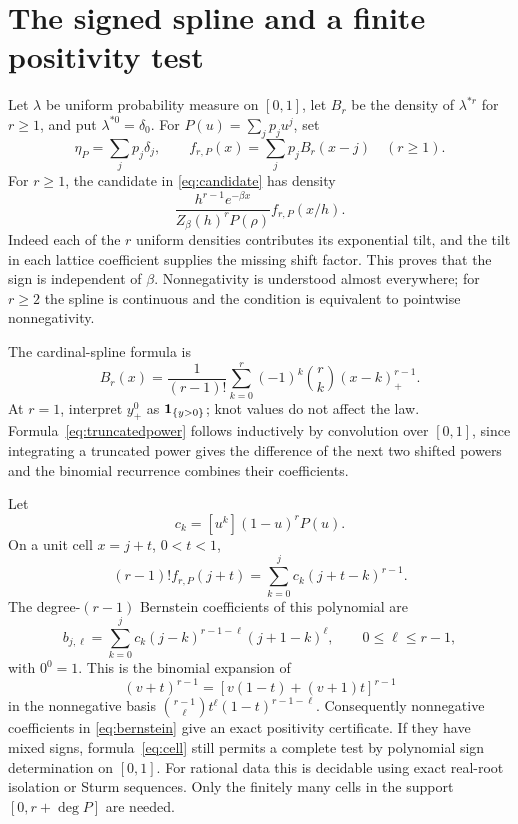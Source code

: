 \documentclass[11pt,a4paper]{article}
\theoremstyle{remark}\newtheorem*{ednote}{Editorial note (ProveIt, 2026-10-01)}
\begin{document}
\section{The signed spline and a finite positivity test}
Let $\lambda$ be uniform probability measure on $[0,1]$, let $B_r$ be the density of $\lambda^{*r}$ for $r\ge1$, and put $\lambda^{*0}=\delta_0$. For $P(u)=\sum_jp_ju^j$, set
\begin{equation}\label{eq:spline}
 \eta_P=\sum_jp_j\delta_j,
 \qquad f_{r,P}(x)=\sum_jp_jB_r(x-j)\quad(r\ge1).
\end{equation}
For $r\ge1$, the candidate in \eqref{eq:candidate} has density
\begin{equation}\label{eq:tiltscaling}
 \frac{h^{r-1}e^{-\beta x}}{Z_\beta(h)^rP(\rho)}
 f_{r,P}(x/h).
\end{equation}
Indeed each of the $r$ uniform densities contributes its exponential tilt, and the tilt in each lattice coefficient supplies the missing shift factor. This proves that the sign is independent of $\beta$. Nonnegativity is understood almost everywhere; for $r\ge2$ the spline is continuous and the condition is equivalent to pointwise nonnegativity.

The cardinal-spline formula is
\begin{equation}\label{eq:truncatedpower}
 B_r(x)=\frac1{(r-1)!}\sum_{k=0}^r(-1)^k\binom rk(x-k)_+^{r-1}.
\end{equation}
At $r=1$, interpret $y_+^0$ as $\mathbf1_{\{y>0\}}$; knot values do not affect the law. Formula~\eqref{eq:truncatedpower} follows inductively by convolution over $[0,1]$, since integrating a truncated power gives the difference of the next two shifted powers and the binomial recurrence combines their coefficients.

Let
\[
 c_k=[u^k](1-u)^rP(u).
\]
On a unit cell $x=j+t$, $0<t<1$,
\begin{equation}\label{eq:cell}
 (r-1)!f_{r,P}(j+t)=\sum_{k=0}^jc_k(j+t-k)^{r-1}.
\end{equation}
The degree-$(r-1)$ Bernstein coefficients of this polynomial are
\begin{equation}\label{eq:bernstein}
 b_{j,\ell}=\sum_{k=0}^jc_k
 (j-k)^{r-1-\ell}(j+1-k)^\ell,
 \qquad 0\le\ell\le r-1,
\end{equation}
with $0^0=1$. This is the binomial expansion of
\[
 (v+t)^{r-1}=[v(1-t)+(v+1)t]^{r-1}
\]
in the nonnegative basis $\binom{r-1}{\ell}t^\ell(1-t)^{r-1-\ell}$. Consequently nonnegative coefficients in \eqref{eq:bernstein} give an exact positivity certificate. If they have mixed signs, formula~\eqref{eq:cell} still permits a complete test by polynomial sign determination on $[0,1]$. For rational data this is decidable using exact real-root isolation or Sturm sequences. Only the finitely many cells in the support $[0,r+\deg P]$ are needed.
\end{document}

